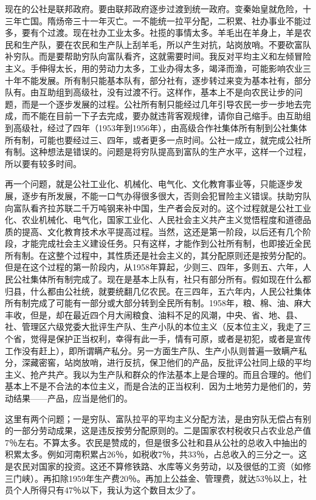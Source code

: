 现在的公社是联邦政府。要由联邦政府逐步过渡到统一政府。变秦始皇就危险，十三年亡国。隋炀帝三十一年灭亡。一不能统一拉平分配，二积累、社办事业不能过多，要有个过渡。现在社办工业太多。社揽的事情太多。羊毛出在羊身上，羊是农民和生产队，要在农民和生产队上刮羊毛，所以产生对抗，站岗放哨。不要砍富队补穷队。而是要帮助穷队向富队看齐，这就需要时间。我反对平均主义和左倾冒险主义。手伸得太长，用的劳动力太多，工业办得太多，竭泽而渔，可能影响农业三十年不能发展。所有制只能基本队有，部分社有，逐步转过来变为基本社有，部分队有。由互助组到高级社，没有过渡不行。这样作，基本上不是向农民让步的问题，而是一个逐步发展的过程。公社所有制只能经过几年引导农民一步一步地去完成，而不能在目前一下子去完成，要办就违背客观规律，请你自己缩手。由互助组到高级社，经过了四年（1953年到1956年），由高级合作社集体所有制到公社集体所有制，可能也要经过三、四年，或者更多一点时间。公社一成立，就完成公社所有制。这种想法是错误的。问题是将穷队提高到富队的生产水平，这样一个过程，所以要有较多时间。

再一个问题，就是公社工业化、机械化、电气化、文化教育事业等，只能逐步发展，逐步有所发展，不能一口气办得很多很大，否则会犯冒险主义错误。扶助穷队向富队看齐拉苏联二千万吨钢来补中国，生产者会反对的。这个过程就是公社工业化、农业机械化、电气化，国家工业化、人民社会主义共产主义觉悟程度和道德品质的提高、文化教育技术水平提高过程。当然，这还是第一阶段，以后还有几个阶段，才能完成社会主义建设任务。只有这样，才能作到公社所有制，也即接近全民所有制。在这整个过程中，其性质还是社会主义的，其分配原则还是按劳分配的。但是在这个过程的第一阶段内，从1958年算起，少则三、四年，多则五、六年，人民公社集体所有制完成了。现在是基本上队有，社只有部分所有。假如现在什么都归县，什么都由公社统，就要统翻几亿农民。在三四年，五六年内，人民公社集体所有制完成了可能有一部分或大部分转到全民所有制。1958年，粮、棉、油、麻大丰收，但是，却在最近四个月大闹粮食、油料不足的风潮，中央、省、地、县、社、管理区六级党委大批评生产队、生产小队的本位主义（反本位主义，我走了三个省，觉得是保护正当权利，幸得有此一手，情有可原，或者是初犯，或者是宣传工作没有赶上），即所谓瞒产私分。另一方面生产队、生产小队则普遍一致瞒产私分，深藏密窖，站岗放哨，进行反抗，保卫他们的产品，反批评公社同上级的平均主义、抢产共产。我以为生产队和群众的作法基本上是合理的。而且合理的。他们基本上不是不合法的本位主义，而是合法的正当权利．因为土地劳力是他们的，劳动结果——产品，应当是他们的。

这里有两个问题；一是穷队、富队拉平的平均主义分配方法，是由穷队无偿占有别的一部分劳动成果，这是违反按劳分配原则的。二是国家农村税收只占农业总产值7％左右。不算太多。农民是赞成的，但是很多公社和县从公社的总收入中抽出的积累太多。例如河南积累占26％，如税收7％，共33％，占总收入的三分之一。这是农民对国家的投资。这还不算修铁路、水库等义务劳动，以及很低的工资（如修三门峡）。再扣除1959年生产费20％。再加上公益金、管理费，就达53％以上，社员个人所得只有47％以下，我认为这个数目太少了。

